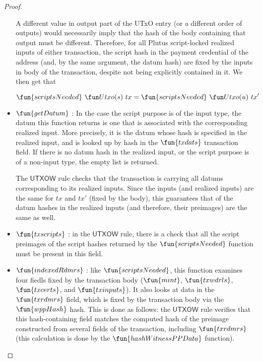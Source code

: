 \begin{property}
\begin{proof}
\begin{itemize}
      A different value in output part of the UTxO entry (or a different order of
      outputs) would necessarily imply
      that the hash of the body containing that output must be different.
      Therefore, for all Plutus script-locked realized inputs of either transaction,
      the script hash in the payment credential of the address
      (and, by the same argument, the datum hash) are fixed by the inputs in body of the
      transaction, despite not being explicitly contained in it. We then get that

      \[ \fun{scriptsNeeded}~\Utxo(s)~tx = \fun{scriptsNeeded}~\Utxo(u)~tx' \]

      \item $\fun{getDatum}$ : In the case the script purpose
      is of the input type, the datum this function returns is one that
      is associated with the corresponding realized input. More precisely, it is the datum whose
      hash is specified in the realized input, and is looked up by hash in the $\fun{txdats}$
      transaction field. If there is no datum hash in the realized input, or the script purpose
      is of a non-input type, the empty list is returned.

      The $\mathsf{UTXOW}$ rule checks that the transaction is carrying all datums corresponding
      to its realized inputs. Since the inputs (and realized inputs) are the same
      for $tx$ and $tx'$ (fixed by the body), this guarantees that
      of the datum hashes in the realized inputs (and therefore, their preimages)
      are the same as well.

      \item $\fun{txscripts}$ : in the $\mathsf{UTXOW}$ rule, there is a check that all the
      script preimages of the script hashes returned by the $\fun{scriptsNeeded}$
      function must be present in this field.

      \item $\fun{indexedRdmrs}$ : like $\fun{scriptsNeeded}$, this function
      examines four fiedls fixed by the transaction body ($\fun{mint}$, $\fun{txwdrls}$,
      $\fun{txcerts}$, and $\fun{txinputs}$).
      It also looks at data in the $\fun{txrdmrs}$ field, which is fixed
      by the transaction body via the $\fun{wppHash}$
      hash. This is done as follows: the $\mathsf{UTXOW}$ rule verifies that this
      hash-containing field matches the computed hash
      of the preimage constructed from several fields of the transaction,
      including $\fun{txrdmrs}$ (this calculation
      is done by the $\fun{hashWitnessPPData}$ function).


\end{itemize}
\end{proof}
\end{property}

